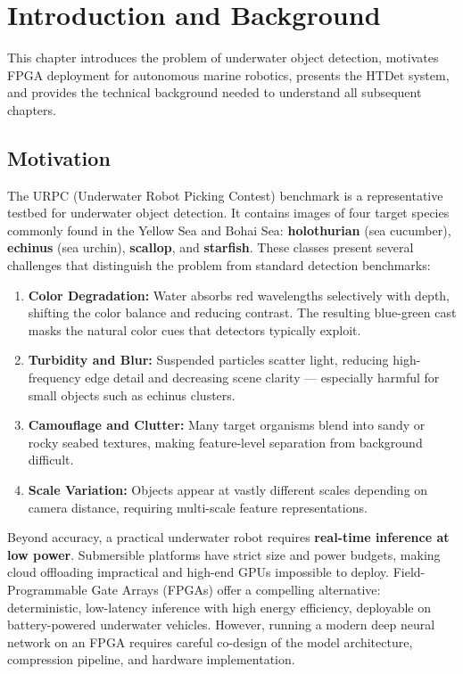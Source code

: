 \chapter{Introduction and Background}

This chapter introduces the problem of underwater object detection, motivates FPGA deployment for autonomous marine robotics, presents the HTDet system, and provides the technical background needed to understand all subsequent chapters.

\section{Motivation}

The URPC (Underwater Robot Picking Contest) benchmark is a representative testbed for underwater object detection. It contains images of four target species commonly found in the Yellow Sea and Bohai Sea: \textbf{holothurian} (sea cucumber), \textbf{echinus} (sea urchin), \textbf{scallop}, and \textbf{starfish}. These classes present several challenges that distinguish the problem from standard detection benchmarks:

\begin{enumerate}
    \item \textbf{Color Degradation:} Water absorbs red wavelengths selectively with depth, shifting the color balance and reducing contrast. The resulting blue-green cast masks the natural color cues that detectors typically exploit.
    \item \textbf{Turbidity and Blur:} Suspended particles scatter light, reducing high-frequency edge detail and decreasing scene clarity — especially harmful for small objects such as echinus clusters.
    \item \textbf{Camouflage and Clutter:} Many target organisms blend into sandy or rocky seabed textures, making feature-level separation from background difficult.
    \item \textbf{Scale Variation:} Objects appear at vastly different scales depending on camera distance, requiring multi-scale feature representations.
\end{enumerate}

Beyond accuracy, a practical underwater robot requires \textbf{real-time inference at low power}. Submersible platforms have strict size and power budgets, making cloud offloading impractical and high-end GPUs impossible to deploy. Field-Programmable Gate Arrays (FPGAs) offer a compelling alternative: deterministic, low-latency inference with high energy efficiency, deployable on battery-powered underwater vehicles. However, running a modern deep neural network on an FPGA requires careful co-design of the model architecture, compression pipeline, and hardware implementation.

